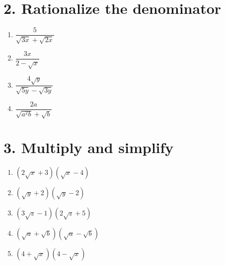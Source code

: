 \documentclass{hw}
\begin{document}
\section*{\normalsize 2. Rationalize the denominator}
\begin{enumerate}[label=\alph*.]
    \item $\dfrac{5}{\sqrt{3x} + \sqrt{2x}}$
        \studentxxlargeworkspace
    \item $\dfrac{3x}{2 - \sqrt{x}}$
        \studentxxlargeworkspace
    \item $\dfrac{4\sqrt{y}}{\sqrt{5y} - \sqrt{3y}}$
        \studentxxlargeworkspace
    \item $\dfrac{2a}{\sqrt{a^2b} + \sqrt{b}}$
        \studentxxlargeworkspace
\end{enumerate}

\section*{\normalsize 3. Multiply and simplify}
\begin{enumerate}[label=\alph*.]
    \item $(2\sqrt{x} + 3)(\sqrt{x} - 4)$
        \studentxxlargeworkspace
    \item $(\sqrt{y} + 2)(\sqrt{y} - 2)$
        \studentxxlargeworkspace
    \item $(3\sqrt{z} - 1)(2\sqrt{z} + 5)$
        \studentxxlargeworkspace
    \item $(\sqrt{a} + \sqrt{b})(\sqrt{a} - \sqrt{b})$
        \studentxxlargeworkspace
    \newpage
    \item $(4 + \sqrt{x})(4 - \sqrt{x})$
        \studentxxlargeworkspace
\end{enumerate}
\end{document}
